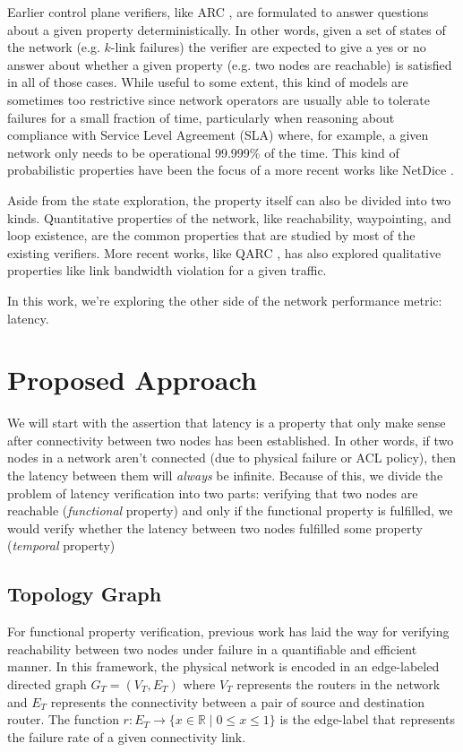 \documentclass[10pt,sigconf,letterpaper,anonymous,nonacm]{acmart}
\begin{document}
Earlier control plane verifiers, like ARC \cite{gember2016fast}, are formulated to answer 
questions about a given property deterministically. 
In other words, given a set of states of the network (e.g. $k$-link failures) the verifier are 
expected to give a yes or no answer about whether a given property (e.g. two nodes are reachable) 
is satisfied in all of those cases. 
While useful to some extent, this kind of models are sometimes too restrictive since network 
operators are usually able to tolerate failures for a small fraction of time, particularly when 
reasoning about compliance with Service Level Agreement (SLA) where, for example, a given network 
only needs to be operational 99.999\% of the time. 
This kind of probabilistic properties have been the focus of a more recent works like NetDice 
\cite{steffen2020probabilistic}.

Aside from the state exploration, the property itself can also be divided into two kinds. 
Quantitative properties of the network, like reachability, waypointing, and loop existence, are 
the common properties that are studied by most of the existing verifiers. 
More recent works, like QARC \cite{subramanian2020detecting}, has also explored qualitative 
properties like link bandwidth violation for a given traffic.

In this work, we're exploring the other side of the network performance metric: latency. 

\section{Proposed Approach}
We will start with the assertion that latency is a property that only make sense 
after connectivity between two nodes has been established. 
In other words, if two nodes in a network aren't connected (due to physical failure 
or ACL policy), then the latency between them will \textit{always} be infinite.
Because of this, we divide the problem of latency verification into two parts: 
verifying that two nodes are reachable (\textit{functional} property) and only if 
the functional property is fulfilled, we would verify whether the latency between 
two nodes fulfilled some property (\textit{temporal} property)

\subsection{Topology Graph}
For functional property verification, previous work \cite{steffen2020probabilistic} 
has laid the way for verifying reachability between two nodes under failure in a 
quantifiable and efficient manner. 
In this framework, the physical network is encoded in an edge-labeled directed graph 
$G_T = (V_T, E_T)$ where $V_T$ represents the routers in the network and 
$E_T$ represents the connectivity between a pair of source and destination router. 
The function $r: E_T \rightarrow \{x \in \mathbb{R} \mid 0 \le x \le 1\}$ is the 
edge-label that represents the failure rate of a given connectivity link.
\end{document}
